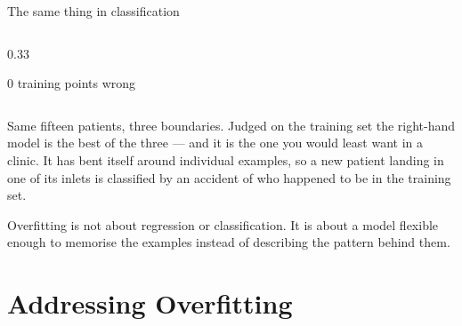 \documentclass[aspectratio=169,10pt]{beamer}
\begin{document}
\begin{frame}{The same thing in classification}
\begin{columns}[T,onlytextwidth]
\begin{column}{0.33\textwidth}
      \par
      \par
      {\tiny 0 training points wrong}
    \end{column}
  \end{columns}
  \vspace{1mm}
  \footnotesize
  Same fifteen patients, three boundaries. Judged on the training set the right-hand model is
  the best of the three --- and it is the one you would least want in a clinic. It has bent
  itself around individual examples, so a new patient landing in one of its inlets is
  classified by an accident of who happened to be in the training set.
  \begin{keyidea}
    Overfitting is not about regression or classification. It is about a model flexible enough
    to memorise the examples instead of describing the pattern behind them.
  \end{keyidea}
\end{frame}

\section{Addressing Overfitting}
\end{document}
